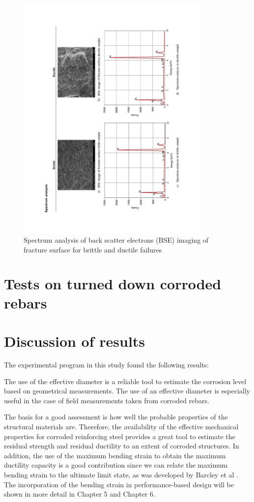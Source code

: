 \begin{figure}[htbp]
	\centering
	\includegraphics[width=0.85\textwidth]{VAC Thesis 2.0/Chapter-4/figs/BBT_SpectrumAnalysis.pdf}
	\caption{Spectrum analysis of back scatter electrons (BSE) imaging of fracture surface for brittle and ductile failures}
	\label{fig:SpectrumAnalysis}
\end{figure}
\section{Tests on turned down corroded rebars}

\section{Discussion of results}

The experimental program in this study found the following results:

The use of the effective diameter is a reliable tool to estimate the corrosion level based on geometrical measurements. The use of an effective diameter is especially useful in the case of field measurements taken from corroded rebars. 

The basis for a good assessment is how well the probable properties of the structural materials are. Therefore, the availability of the effective mechanical properties for corroded reinforcing steel provides a great tool to estimate the residual strength and residual ductility to an extent of corroded structures. In addition, the use of the maximum bending strain to obtain the maximum ductility capacity is a good contribution since we can relate the maximum bending strain to the ultimate limit state, as was developed by Barcley et al \cite{Barcley2018}. The incorporation of the bending strain in performance-based design will be shown in more detail in Chapter 5 and Chapter 6. 

